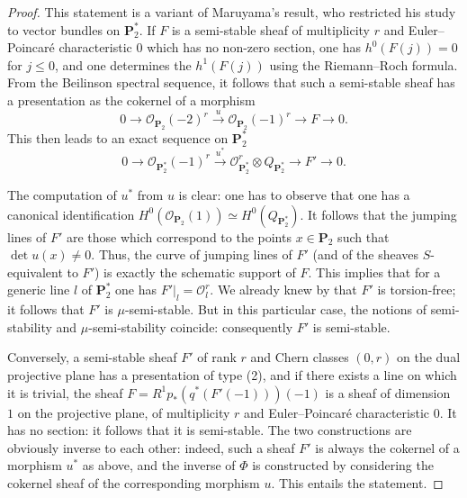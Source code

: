 \documentclass[12pt,english]{smfart}%
\theoremstyle{plain}
\theoremstyle{definition}
\theoremstyle{remark}
\newcommand{\PP}{\mathbf{P}}
\newcommand{\Oh}{\mathcal{O}}
\newcommand{\origpage}[1]{\marginnote{\scriptsize\itshape p.~#1}}
\begin{document}
\origpage{658}
\begin{proof}
This statement is a variant of Maruyama's result, who restricted his study to vector bundles on $\PP_{2}^{*}$. If $F$ is a semi-stable sheaf of multiplicity $r$ and Euler--Poincar\'e characteristic $0$ which has no non-zero section, one has $h^{0}(F(j))=0$ for $j\leq 0$, and one determines the $h^{1}(F(j))$ using the Riemann--Roch formula. From the Beilinson spectral sequence, it follows that such a semi-stable sheaf has a presentation as the cokernel of a morphism
\begin{equation}
0 \to \Oh_{\PP_{2}}(-2)^{r} \stackrel{u}{\longrightarrow} \Oh_{\PP_{2}}(-1)^{r}
\to F \to 0 .
\end{equation}
This then leads to an exact sequence on $\PP_{2}^{*}$
\begin{equation}
0 \to \Oh_{\PP_{2}^{*}}(-1)^{r} \stackrel{u^{*}}{\longrightarrow}
\Oh_{\PP_{2}^{*}}^{r} \otimes Q_{\PP_{2}^{*}} \to F' \to 0 .
\end{equation}

The computation of $u^{*}$ from $u$ is clear: one has to observe that one has a canonical identification $H^{0}(\Oh_{\PP_{2}}(1))\simeq H^{0}(Q_{\PP_{2}^{*}})$. It follows that the jumping lines of $F'$ are those which correspond to the points $x\in\PP_{2}$ such that $\det u(x)\neq 0$. Thus, the curve of jumping lines of $F'$ (and of the sheaves $S$-equivalent to $F'$) is exactly the schematic support of $F$. This implies that for a generic line $l$ of $\PP_{2}^{*}$ one has $F'|_{l}=\Oh_{l}^{r}$. We already knew by  that $F'$ is torsion-free; it follows that $F'$ is $\mu$-semi-stable. But in this particular case, the notions of semi-stability and $\mu$-semi-stability coincide: consequently $F'$ is semi-stable.

Conversely, a semi-stable sheaf $F'$ of rank $r$ and Chern classes $(0,r)$ on the dual projective plane has a presentation of type (2), and if there exists a line on which it is trivial, the sheaf $F=R^{1}p_{*}(q^{*}(F'(-1)))(-1)$ is a sheaf of dimension~$1$ on the projective plane, of multiplicity $r$ and Euler--Poincar\'e characteristic $0$. It has no section: it follows that it is semi-stable. The two constructions are obviously inverse to each other: indeed, such a sheaf $F'$ is always the cokernel of a morphism $u^{*}$ as above, and the inverse of $\Phi$ is constructed by considering the cokernel sheaf of the corresponding morphism $u$. This entails the statement.
\end{proof}
\end{document}
